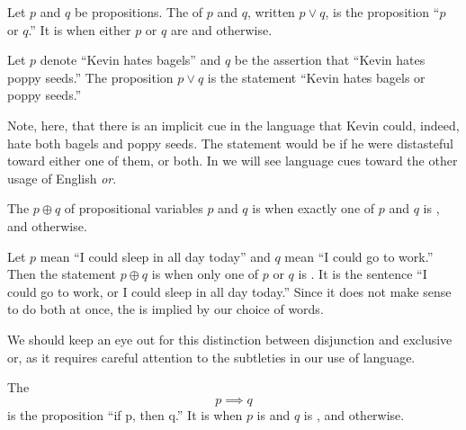 \begin{defn}[disjunction]
  Let $p$ and $q$ be propositions.
  The 
  of $p$ and $q$,
  written $p \vee q$,
  is the proposition
  ``$p$ or $q$.''
  It is \ltrue{} when either $p$ or $q$ are \ltrue{} and \lfalse{} otherwise.
\end{defn}

\begin{ex}
  Let $p$ denote ``Kevin hates bagels'' and
  $q$ be the assertion that ``Kevin hates poppy seeds.''
  The proposition $p \vee q$ is the statement ``Kevin hates bagels or poppy seeds.''
  \begin{remark}
    Note, here, that there is an implicit cue in the language that Kevin could,
    indeed, hate both bagels and poppy seeds.
    The statement would be \ltrue{} if he were distasteful toward either one of them,
    or both. In  we will see language cues toward the
    other usage of English \emph{or}.
  \end{remark}
\end{ex}

\begin{defn}[exclusive or]
  The 
  $p \oplus q$
  of propositional variables
  $p$ and $q$ is \ltrue{} when exactly one of $p$ and $q$ is \ltrue{},
  and \lfalse{} otherwise.
\end{defn}

\begin{ex}
  Let $p$ mean ``I could sleep in all day today''
  and $q$ mean ``I could go to work.''
  Then the statement $p \oplus q$ is \ltrue{} when only one of $p$ or $q$ is \ltrue{}.
  It is the sentence ``I could go to work, or I could sleep in all day today.''
  Since it does not make sense to do both at once,
  the  is implied by our choice of words.
  \begin{remark}
    We should keep an eye out for this distinction between disjunction and
    exclusive or, as it requires careful attention to the subtleties in our use of
    language.
  \end{remark}
  \label{ex:prop:xordefn}
\end{ex}

\begin{defn}
  The 
  \begin{equation}
    p \implies q
    \label{eq:propositional:conditional}
  \end{equation}
  is the proposition ``if p, then q.''
  It is \lfalse{} when $p$ is \ltrue{} and $q$ is \lfalse{}, and \ltrue{} otherwise.
  \label{def:conditional}
\end{defn}

